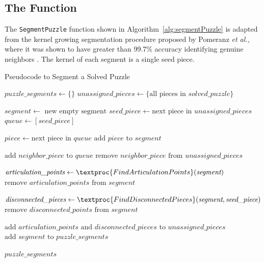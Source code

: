 \subsection{The  Function}\label{sec:segmentPuzzle}

The \texttt{SegmentPuzzle} function shown in Algorithm~\ref{alg:segmentPuzzle} is adapted from the kernel growing segmentation procedure proposed by Pomeranz \textit{et al.}, where it was shown to have greater than 99.7\% accuracy identifying genuine neighbors \cite{pomeranz2011}. The kernel of each segment is a single seed piece.

\begin{algorithm}[tb]
\caption{Pseudocode to Segment a Solved Puzzle}\label{alg:segmentPuzzle}
\begin{algorithmic}[1]
    \State $puzzle\_segments \gets \{ \}$
    \State $unassigned\_pieces \gets \{ \text{all pieces in } solved\_puzzle \}$
\item[]
        \State $segment \gets \text{ new empty segment}$
        \State $seed\_piece \gets \text{next piece in } unassigned\_pieces$
        \State $queue \gets [seed\_piece]$
\item[]
            \State $piece \gets \text{next piece in } queue$
            \State $\text{add } piece \text{ to } segment$
\item[]
            		\State $\text{add } neighbor\_piece \text{ to } \textit{queue}$
            		\State $\text{remove } neighbor\_piece \text{ from } unassigned\_pieces$
            	\EndIf
            \EndFor
        \EndWhile
\item[]
        \State $\textit{articulation\_points} \gets \textproc{FindArticulationPoints}(\textit{segment})$
        \State $\text{remove } \textit{articulation\_points} \text{ from } \textit{segment}$
\item[]
		\State $\textit{disconnected\_pieces} \gets \textproc{FindDisconnectedPieces}(\textit{segment},\textit{seed\_piece})$ 
		\State $\text{remove } \textit{disconnected\_points} \text{ from } \textit{segment}$
\item[]
        \State $\text{add } \textit{articulation\_points} \text{ and } \textit{disconnected\_pieces} \text{ to } \textit{unassigned\_pieces}$               	
		\State $\text{add } segment \text{ to } puzzle\_segments$	
    \EndWhile
\item[]
    \State \Return $\textit{puzzle\_segments}$
\EndFunction
\end{algorithmic}
\end{algorithm}

